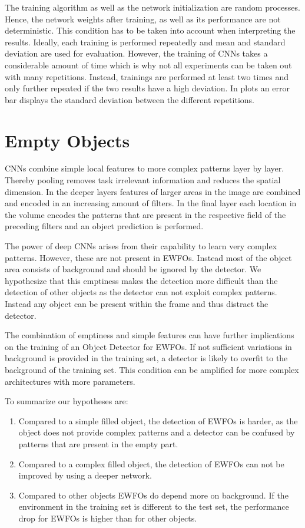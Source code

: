 The training algorithm as well as the network initialization are random processes. Hence, the network weights after training, as well as its performance are not deterministic. This condition has to be taken into account when interpreting the results. Ideally, each training is performed repeatedly and mean and standard deviation are used for evaluation. However, the training of \acp{CNN} takes a considerable amount of time which is why not all experiments can be taken out with many repetitions. Instead, trainings are performed at least two times and only further repeated if the two results have a high deviation. In plots an error bar displays the standard deviation between the different repetitions.

\section{Empty Objects}

\acp{CNN} combine simple local features to more complex patterns layer by layer. Thereby pooling removes task irrelevant information and reduces the spatial dimension. In the deeper layers features of larger areas in the image are combined and encoded in an increasing amount of filters. In the final layer each location in the volume encodes the patterns that are present in the respective field of the preceding filters and an object prediction is performed.

The power of deep \acp{CNN} arises from their capability to learn very complex patterns. However, these are not present in \acp{EWFO}. Instead most of the object area consists of background and should be ignored by the detector. We hypothesize that this emptiness makes the detection more difficult than the detection of other objects as the detector can not exploit complex patterns. Instead any object can be present within the frame and thus distract the detector.

The combination of emptiness and simple features can have further implications on the training of an Object Detector for \acp{EWFO}. If not sufficient variations in background is provided in the training set, a detector is likely to overfit to the background of the training set. This condition can be amplified for more complex architectures with more parameters.

To summarize our hypotheses are:
\begin{enumerate}
	\item Compared to a simple filled object, the detection of \acp{EWFO} is harder, as the object does not provide complex patterns and a detector can be confused by patterns that are present in the empty part. 
	\item Compared to a complex filled object, the detection of \acp{EWFO} can not be improved by using a deeper network.
	\item Compared to other objects \acp{EWFO} do depend more on background. If the environment in the training set is different to the test set, the performance drop for \acp{EWFO} is higher than for other objects. 
\end{enumerate}


